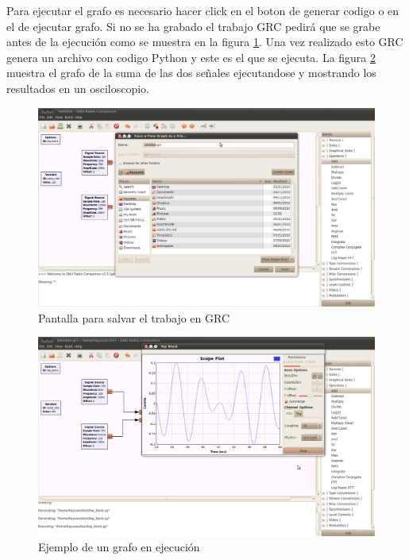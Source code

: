 Para ejecutar el grafo es necesario hacer click en el boton de generar codigo o en el de ejecutar
grafo. Si no se ha grabado el trabajo GRC pedir\'a que se grabe antes de la ejecuci\'on como se
muestra en la figura \ref{fig:savegrc}. Una vez realizado esto GRC genera un archivo con codigo
Python y este es el que se ejecuta. La figura \ref{fig:rungrc} muestra el grafo de la suma de las
dos se\~nales ejecutandose y mostrando los resultados en un osciloscopio.

\begin{figure}[htp]
  \centering
  \includegraphics[width=5.5in]{figs/grc5}
  \vspace{0.1in}
  \caption{Pantalla para salvar el trabajo en GRC}
  \label{fig:savegrc}
\end{figure}

\begin{figure}[htp]
  \centering
  \includegraphics[width=5.5in]{figs/grc7}
  \vspace{0.1in}
  \caption{Ejemplo de un grafo en ejecuci\'on}
  \label{fig:rungrc}
\end{figure}

